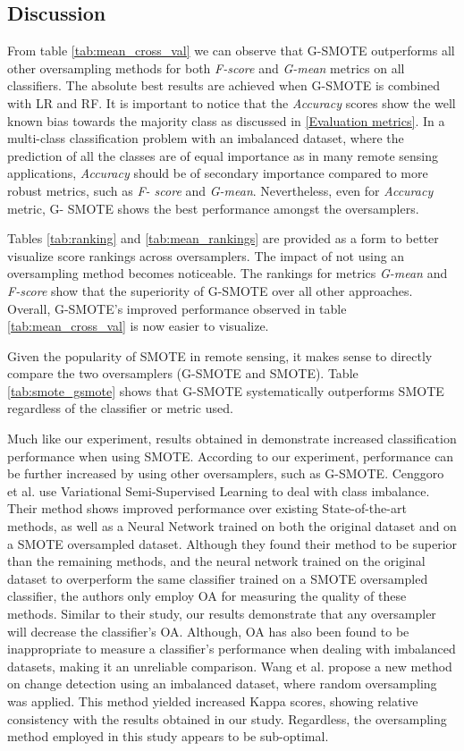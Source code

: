 \documentclass[remotesensing,article,submit,moreauthors,pdftex]{Definitions/mdpi}
\begin{document}
\subsection{Discussion}

From table \ref{tab:mean_cross_val} we can observe that G-SMOTE outperforms all
other oversampling methods for both \textit{F-score} and \textit{G-mean} metrics
on all classifiers. The absolute best results are achieved when G-SMOTE is
combined with LR and RF. It is important to notice that the \textit{Accuracy}
scores show the well known bias towards the majority class as discussed in
\ref{Evaluation metrics}. In a multi-class classification problem with an
imbalanced dataset, where the prediction of all the classes are of equal
importance as in many remote sensing applications, \textit{Accuracy} should be
of secondary importance compared to more robust metrics, such as \textit{F-
	score} and \textit{G-mean}. Nevertheless, even for \textit{Accuracy} metric, G-
SMOTE shows the best performance amongst the oversamplers.

Tables \ref{tab:ranking} and \ref{tab:mean_rankings} are provided as a form to
better visualize score rankings across oversamplers. The impact of not using an 
oversampling method becomes noticeable. The rankings for metrics \textit{G-mean}
and \textit{F-score} show that the superiority of G-SMOTE over all other approaches.
Overall, G-SMOTE's improved performance observed in table \ref{tab:mean_cross_val} is 
now easier to visualize.

Given the popularity of SMOTE in remote sensing, it makes sense to directly
compare the two oversamplers (G-SMOTE and SMOTE). Table \ref{tab:smote_gsmote}
shows that G-SMOTE systematically outperforms SMOTE regardless of the classifier or metric
used.

Much like our experiment, results obtained in \cite{Feng2019} demonstrate
increased classification performance when using SMOTE. According to
our experiment, performance can be further increased by using other 
oversamplers, such as G-SMOTE. Cenggoro et al. \cite{Cenggoro2018} use 
Variational
Semi-Supervised Learning to deal with class imbalance. Their method shows
improved performance over existing State-of-the-art methods, as well as a Neural
Network trained on both the original dataset and on a SMOTE oversampled dataset.
Although they found their method to be superior than the remaining methods, and
the neural network trained on the original dataset to overperform the same
classifier trained on a SMOTE oversampled classifier, the authors only employ OA
for measuring the quality of these methods. Similar to their study, our results
demonstrate that any oversampler will decrease the classifier's OA. Although, OA
has also been found to be inappropriate to measure a classifier's performance
when dealing with imbalanced datasets, making it an unreliable comparison. Wang
et al. \cite{Wang2019} propose a new method on change detection using an
imbalanced dataset, where random oversampling was applied. This method yielded
increased Kappa scores, showing relative consistency with the results obtained
in our study. Regardless, the oversampling method employed in this study appears
to be sub-optimal.
\end{document}
